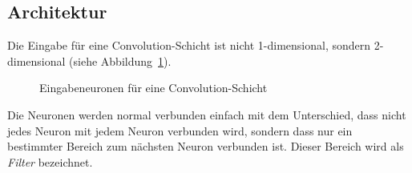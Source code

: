 \documentclass[12pt,a4paper]{report}
\begin{document}
\subsection{Architektur}
Die Eingabe für eine Convolution-Schicht ist nicht 1-dimensional, sondern 2-dimensional (siehe Abbildung~\ref{fig:conv1}).
\begin{figure}[!h]
    \centering
{}
    \caption{Eingabeneuronen für eine Convolution-Schicht}
    \label{fig:conv1}
\end{figure}
Die Neuronen werden normal verbunden einfach mit dem Unterschied, dass nicht jedes Neuron mit jedem Neuron verbunden wird,
sondern dass nur ein bestimmter Bereich zum nächsten Neuron verbunden ist.
Dieser Bereich wird als \textit{Filter} bezeichnet.
\end{document}
